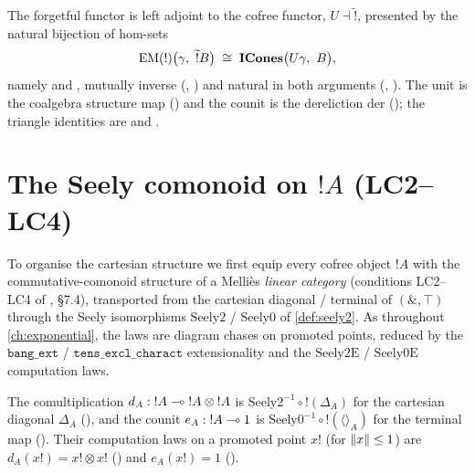 \begin{theorem}\label{thm:cbv-cofree-adj}
\rocqok
{}\rocqok
{}\rocqok
{}\rocqok
{}
The forgetful functor is left adjoint to the cofree functor,
$U \dashv \widetilde{\mathord{!}}$, presented by the natural
bijection of hom-sets
\[
  \mathrm{EM}(\mathord{!})\bigl(\gamma,\ \widetilde{\mathord{!}}B\bigr)
  \;\cong\;
  \ICones\bigl(U\gamma,\ B\bigr),
\]
namely  and
, mutually inverse
(,
) and natural in both arguments
(,
). The unit is the coalgebra
structure map () and the counit is the
dereliction $\mathrm{der}$ (); the
triangle identities are  and
.
\end{theorem}

\section{The Seely comonoid on \texorpdfstring{$\mathord{!}A$}{!A} (LC2--LC4)}\label{sec:cbv-comonoid}

To organise the cartesian structure we first equip every cofree object
$\mathord{!}A$ with the commutative-comonoid structure of a Melli\`es
\emph{linear category} (conditions LC2--LC4 of
\cite{mellies-categorical-semantics}, \S7.4), transported from the
cartesian diagonal / terminal of $(\mathbin{\&}, \top)$ through the Seely
isomorphisms $\mathrm{Seely2}$ / $\mathrm{Seely0}$ of
\autoref{def:seely2}. As throughout \autoref{ch:exponential}, the laws
are diagram chases on promoted points, reduced by the
$\texttt{bang\_ext}$ / $\texttt{tens\_excl\_charact}$ extensionality and
the $\mathrm{Seely2E}$ / $\mathrm{Seely0E}$ computation laws.

\begin{definition}\label{def:cbv-d-e}
\rocqok
{}\rocqok
{}
The comultiplication
$d_A : \mathord{!}A \multimap \mathord{!}A \otimes \mathord{!}A$ is
$\mathrm{Seely2}^{-1} \circ \mathord{!}(\Delta_A)$ for the cartesian
diagonal $\Delta_A$ (), and the
counit $e_A : \mathord{!}A \multimap 1$ is
$\mathrm{Seely0}^{-1} \circ \mathord{!}(\langle\rangle_A)$ for the
terminal map (). Their
computation laws on a promoted point $x!$ (for $\lVert x \rVert \leq 1$) are
$d_A(x!) = x! \otimes x!$ ()
and $e_A(x!) = 1$ ().
\end{definition}

